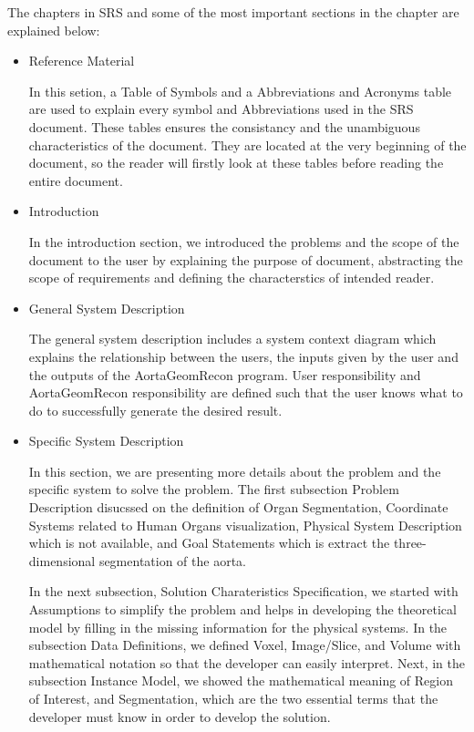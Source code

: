 The chapters in SRS and some of the most important sections in the chapter are explained below:
\begin{itemize}
\item Reference Material

In this setion, a Table of Symbols and a Abbreviations and Acronyms table are used to explain every symbol and Abbreviations used in the SRS document. These tables ensures the consistancy and the unambiguous characteristics of the document. They are located at the very beginning of the document, so the reader will firstly look at these tables before reading the entire document.

\item Introduction

In the introduction section, we introduced the problems and the scope of the document to the user by explaining the purpose of document, abstracting the scope of requirements and defining the characterstics of intended reader. 

\item General System Description

The general system description includes a system context diagram which explains the relationship between the users, the inputs given by the user and the outputs of the AortaGeomRecon program. User responsibility and AortaGeomRecon responsibility are defined such that the user knows what to do to successfully generate the desired result. 

\item Specific System Description

In this section, we are presenting more details about the problem and the specific system to solve the problem. The first subsection Problem Description disucssed on the definition of Organ Segmentation, Coordinate Systems related to Human Organs visualization, Physical System Description which is not available, and Goal Statements which is extract the three-dimensional segmentation of the aorta.

In the next subsection, Solution Charateristics Specification, we started with Assumptions to simplify the problem and helps in developing the theoretical model by filling in the missing information for the physical systems. In the subsection Data Definitions, we defined Voxel, Image/Slice, and Volume with mathematical notation so that the developer can easily interpret. Next, in the subsection Instance Model, we showed the mathematical meaning of Region of Interest, and Segmentation, which are the two essential terms that the developer must know in order to develop the solution.



\end{itemize}

